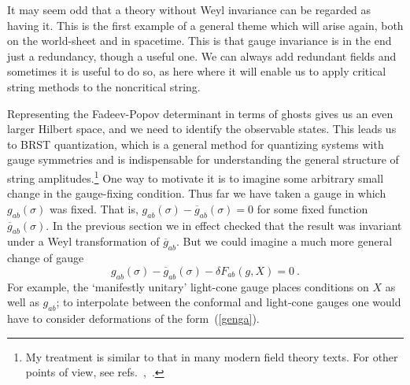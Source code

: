It may seem odd that a theory without Weyl invariance can be
regarded as having it.  This is the first example of a general
theme which will arise again, both on the world-sheet and in
spacetime.  This is that gauge invariance is in the end just a
redundancy, though a useful one.  We can always add redundant
fields and sometimes it is useful to do so, as here where
it will enable us to apply critical string methods to the
noncritical string.  


Representing the Fadeev-Popov determinant in terms of ghosts gives us an
even larger Hilbert space, and we need to identify the observable states.
This leads us to
BRST quantization, which is a general method for quantizing systems with
gauge symmetries and is indispensable for understanding the general
structure of string amplitudes.\footnote{My treatment is similar
to that in many modern field theory texts.  For other points of
view, see refs.~\cite{KO'},~\cite{HT}.}
One way to motivate it is to
imagine some
arbitrary small change in the gauge-fixing condition.  Thus far we have
taken a gauge in which $g_{ab}(\sigma)$ was fixed.  That is,
$g_{ab}(\sigma) - \overline g_{ab}(\sigma) = 0$ for
some fixed function $\overline g_{ab}(\sigma)$.  In the previous
section we in effect
checked that the result was invariant under a Weyl
transformation of $\overline g_{ab}$.  But we could imagine a much
more general change of gauge
\begin{equation} g_{ab}(\sigma) -
\overline g_{ab}(\sigma) - \delta F_{ab}(g,X) = 0\ . \label{genga}
\end{equation}
For example, the `manifestly unitary' light-cone gauge places conditions on
$X$ as well as $g_{ab}$; to interpolate between the conformal and
light-cone gauges one would have to consider deformations of the
form~(\ref{genga}).

